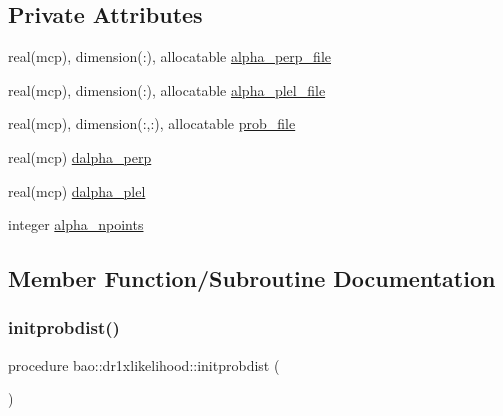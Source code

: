 \subsection*{Private Attributes}
\begin{DoxyCompactItemize}
\item 
real(mcp), dimension(\+:), allocatable \mbox{\hyperlink{structbao_1_1dr1xlikelihood_a6822558d02356a0bbc92c03eaeae1a75}{alpha\+\_\+perp\+\_\+file}}
\item 
real(mcp), dimension(\+:), allocatable \mbox{\hyperlink{structbao_1_1dr1xlikelihood_a0da233c8cf8db32b29229e8829e07abd}{alpha\+\_\+plel\+\_\+file}}
\item 
real(mcp), dimension(\+:,\+:), allocatable \mbox{\hyperlink{structbao_1_1dr1xlikelihood_ac71d018f2f85f725fd96f36aba612d55}{prob\+\_\+file}}
\item 
real(mcp) \mbox{\hyperlink{structbao_1_1dr1xlikelihood_a12b13a353ca6725ca408c9c0fe7f06fc}{dalpha\+\_\+perp}}
\item 
real(mcp) \mbox{\hyperlink{structbao_1_1dr1xlikelihood_a98e51dafd2121274f06ad9f67b9eecf0}{dalpha\+\_\+plel}}
\item 
integer \mbox{\hyperlink{structbao_1_1dr1xlikelihood_a331535dfcf3531b30386e0ad300e9e73}{alpha\+\_\+npoints}}
\end{DoxyCompactItemize}


\subsection{Member Function/\+Subroutine Documentation}
\mbox{\label{structbao_1_1dr1xlikelihood_a4f410a1bd4608d3383d278b1dd53e2c0}} 
\subsubsection{\texorpdfstring{initprobdist()}{initprobdist()}}
{\footnotesize\ttfamily procedure bao\+::dr1xlikelihood\+::initprobdist (\begin{DoxyParamCaption}{ }\end{DoxyParamCaption})\hspace{0.3cm}{\ttfamily [private]}}

\mbox{\label{structbao_1_1dr1xlikelihood_a8a778cdb04d0bc93e13bdac9b2bbc84e}} 

